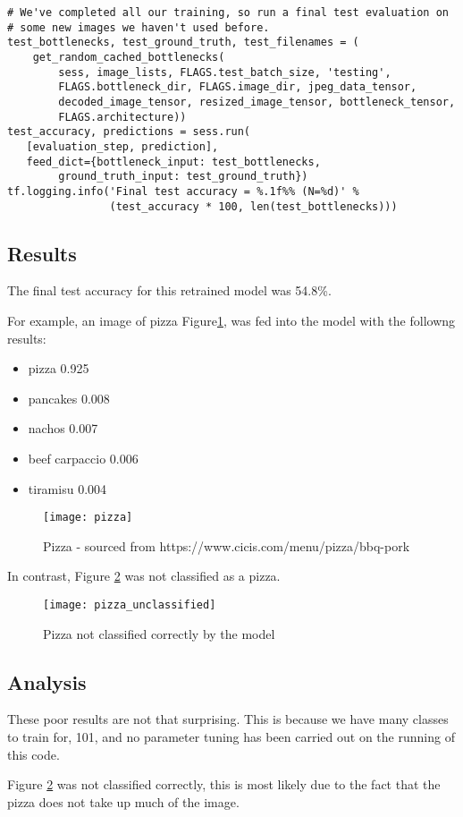 \begin{lstlisting}[style=Python]
# We've completed all our training, so run a final test evaluation on
# some new images we haven't used before.
test_bottlenecks, test_ground_truth, test_filenames = (
    get_random_cached_bottlenecks(
        sess, image_lists, FLAGS.test_batch_size, 'testing',
        FLAGS.bottleneck_dir, FLAGS.image_dir, jpeg_data_tensor,
        decoded_image_tensor, resized_image_tensor, bottleneck_tensor,
        FLAGS.architecture))
test_accuracy, predictions = sess.run(
   [evaluation_step, prediction],
   feed_dict={bottleneck_input: test_bottlenecks,
        ground_truth_input: test_ground_truth})
tf.logging.info('Final test accuracy = %.1f%% (N=%d)' %
                (test_accuracy * 100, len(test_bottlenecks)))
\end{lstlisting}

\subsection*{Results}
The final test accuracy for this retrained model was 54.8\%.

For example, an image of pizza Figure\ref{fig:pizza}, was fed into the model with the followng results:
\begin{itemize}
    \item{pizza 0.925}
    \item{pancakes 0.008}
    \item{nachos 0.007}
    \item{beef carpaccio 0.006}
    \item{tiramisu 0.004}
\end{itemize}

\begin{figure}
     \texttt{[image: pizza]}
     \caption{Pizza - sourced from https://www.cicis.com/menu/pizza/bbq-pork}
     \label{fig:pizza}
\end{figure}

In contrast, Figure \ref{fig:pizza_unclassified} was not classified as a pizza.

\begin{figure}
     \texttt{[image: pizza\_unclassified]}
     \caption{Pizza not classified correctly by the model}
     \label{fig:pizza_unclassified}
\end{figure}

\subsection*{Analysis}
These poor results are not that surprising.
This is because we have many classes to train for, 101, and no parameter tuning has been carried out on the running of this code.

Figure \ref{fig:pizza_unclassified} was not classified correctly, this is most likely due to the fact that the pizza does not take up much of the image.

